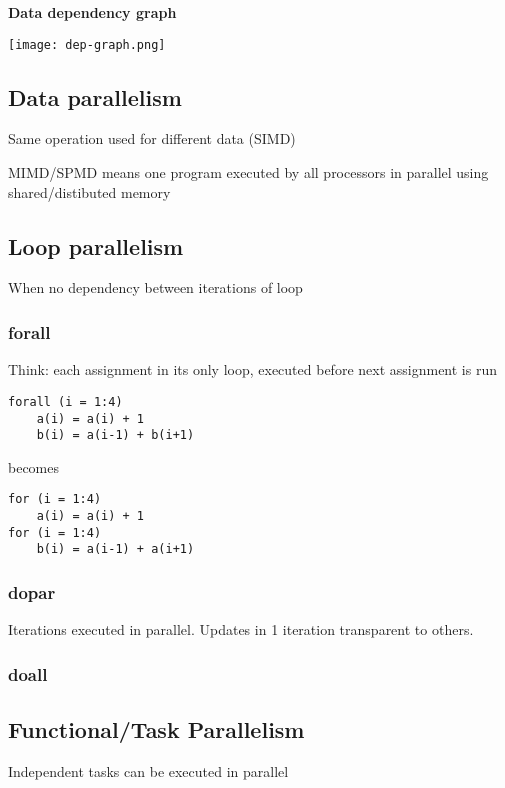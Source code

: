 \documentclass[12pt]{article}
\begin{document}
\begin{spacing}{1.5}
\textbf{Data dependency graph}

\texttt{[image: dep-graph.png]}

\subsection{Data parallelism}

Same operation used for different data (SIMD)

MIMD/SPMD means one program executed by all processors in parallel using shared/distibuted memory

\subsection{Loop parallelism}

When no dependency between iterations of loop

\subsubsection{forall}

Think: each assignment in its only loop, executed before next assignment is run

\begin{verbatim}
forall (i = 1:4)
    a(i) = a(i) + 1
    b(i) = a(i-1) + b(i+1)
\end{verbatim}

becomes

\begin{verbatim}
for (i = 1:4)
    a(i) = a(i) + 1
for (i = 1:4)
    b(i) = a(i-1) + a(i+1)
\end{verbatim}

\subsubsection{dopar}

Iterations executed in parallel. Updates in 1 iteration transparent to others. 

\subsubsection{doall}


\subsection{Functional/Task Parallelism}

\begin{itemize*}
	\item Independent tasks can be executed in parallel
\end{itemize*}


\end{spacing}
\end{document}

